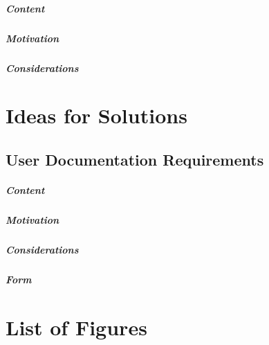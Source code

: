 \documentclass{article}
\begin{document}
\subparagraph{Content}
\subparagraph{Motivation}
\subparagraph{Considerations}

\section{Ideas for Solutions}

\subsection{User Documentation Requirements}
\subparagraph{Content}
\subparagraph{Motivation}
\subparagraph{Considerations}
\subparagraph{Form}

\section*{List of Figures}
\end{document}
